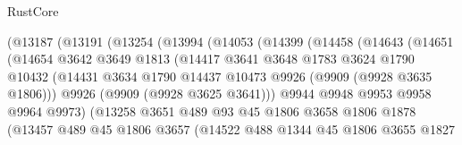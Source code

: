 \begin{lexlean}{RustCore}
\begin{coremodule}
                    (@13187
                      (@13191
                        (@13254
                          (@13994
                            (@14053
                              (@14399
                                (@14458
                                  (@14643
                                    (@14651
                                      (@14654
                                        @3642
                                        @3649
                                        @1813
                                        (@14417
                                          @3641
                                          @3648
                                          @1783
                                          @3624
                                          @1790
                                          @10432
                                          (@14431
                                            @3634
                                            @1790
                                            @14437
                                            @10473
                                            @9926
                                            (@9909 (@9928 @3635 @1806)))
                                          @9926
                                          (@9909 (@9928 @3625 @3641)))
                                        @9944
                                        @9948
                                        @9953
                                        @9958
                                        @9964
                                        @9973)
                                      (@13258
                                        @3651
                                        @489
                                        @93
                                        @45
                                        @1806
                                        @3658
                                        @1806
                                        @1878
                                        (@13457
                                          @489
                                          @45
                                          @1806
                                          @3657
                                          (@14522
                                            @488
                                            @1344
                                            @45
                                            @1806
                                            @3655
                                            @1827

\end{coremodule}
\end{lexlean}

